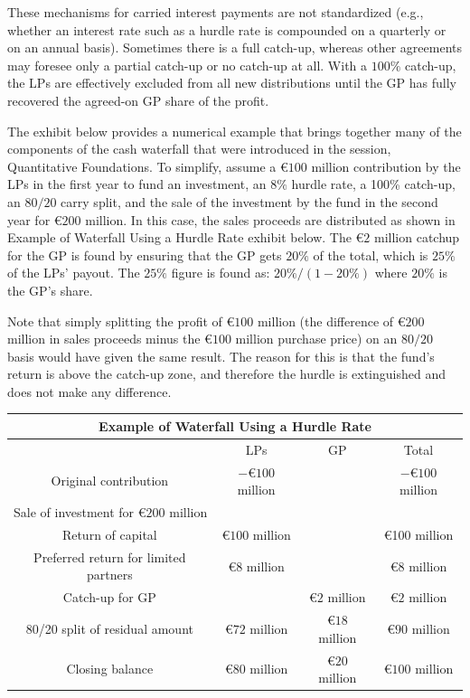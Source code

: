 \documentclass[11pt]{article}
\begin{document}
These mechanisms for carried interest payments are not standardized (e.g., whether an interest rate such as a hurdle rate is compounded on a quarterly or on an annual basis). Sometimes there is a full catch-up, whereas other agreements may foresee only a partial catch-up or no catch-up at all. With a $100 \%$ catch-up, the LPs are effectively excluded from all new distributions until the GP has fully recovered the agreed-on GP share of the profit.

The exhibit below provides a numerical example that brings together many of the components of the cash waterfall that were introduced in the session, Quantitative Foundations. To simplify, assume a $€ 100$ million contribution by the LPs in the first year to fund an investment, an $8 \%$ hurdle rate, a 100\% catch-up, an $80 / 20$ carry split, and the sale of the investment by the fund in the second year for $€ 200$ million. In this case, the sales proceeds are distributed as shown in Example of Waterfall Using a Hurdle Rate exhibit below. The $€ 2$ million catchup for the GP is found by ensuring that the GP gets $20 \%$ of the total, which is $25 \%$ of the LPs' payout. The $25 \%$ figure is found as: $20 \% /(1-20 \%)$ where $20 \%$ is the GP's share.

Note that simply splitting the profit of $€ 100$ million (the difference of $€ 200$ million in sales proceeds minus the $€ 100$ million purchase price) on an $80 / 20$ basis would have given the same result. The reason for this is that the fund's return is above the catch-up zone, and therefore the hurdle is extinguished and does not make any difference.

\begin{center}
\begin{tabular}{|c|c|c|c|}
\hline
\multicolumn{4}{|c|}{Example of Waterfall Using a Hurdle Rate} \\
\hline
 & LPs & GP & Total \\
\hline
Original contribution & $-€ 100$ million &  & $-€ 100$ million \\
\hline
\multicolumn{4}{|l|}{Sale of investment for $€ 200$ million} \\
\hline
Return of capital & $€ 100$ million &  & €100 million \\
\hline
Preferred return for limited partners & €8 million &  & €8 million \\
\hline
Catch-up for GP &  & $€ 2$ million & $€ 2$ million \\
\hline
80/20 split of residual amount & $€ 72$ million & $€ 18$ million & $€ 90$ million \\
\hline
Closing balance & $€ 80$ million & $€ 20$ million & $€ 100$ million \\
\hline
\end{tabular}
\end{center}
\end{document}
